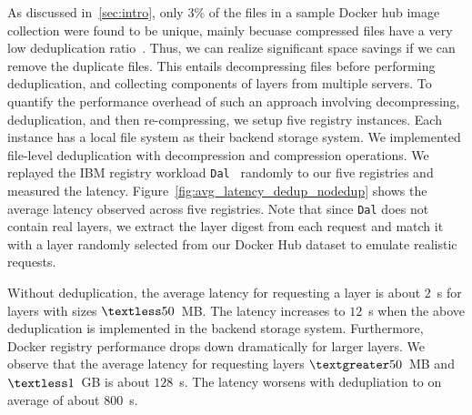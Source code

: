 As discussed in~\cref{sec:intro}, only $3$\% of the files in a sample Docker hub image collection were found to be unique, mainly becuase 
 compressed files have a very low deduplication ratio~\cite{meister2012study}.
Thus, 
we can realize significant space savings if we can remove the 
duplicate files. This entails decompressing files before performing deduplication, and collecting components of layers from multiple servers.
%
To quantify the performance overhead of such an approach involving decompressing, deduplication, and then re-compressing,
we setup five registry instances. Each instance has a local file system as their backend storage system. We
implemented file-level deduplication with decompression and compression operations.
We replayed the IBM registry workload \texttt{Dal}~\cite{dockerworkload} 
randomly to our five registries and measured the latency. 
%
Figure~\ref{fig:avg_latency_dedup_nodedup} shows the average latency observed 
across five registries.
Note that since 
\texttt{Dal} does not contain real layers,
we extract the layer digest from each request and match it with a layer randomly selected from our Docker Hub dataset to emulate realistic requests.

Without deduplication,
the average latency for requesting a layer is about $2$~s for layers with sizes $\textless50$~MB.
The latency increases to $12$~s when the above deduplication is implemented in the backend storage system.
Furthermore, Docker registry performance drops down dramatically for larger layers.
We observe that the average latency for requesting layers $\textgreater50$~MB and $\textless1$~GB
is about $128$~s. The latency worsens with dedupliation to on average of about $800$~s.


